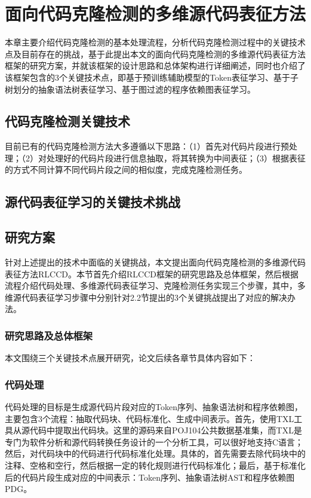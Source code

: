 \chapter{面向代码克隆检测的多维源代码表征方法}

本章主要介绍代码克隆检测的基本处理流程，分析代码克隆检测过程中的关键技术点及目前存在的挑战，基于此提出本文的面向代码克隆检测的多维源代码表征方法框架的研究方案，并就该框架的设计思路和总体架构进行详细阐述，同时也介绍了该框架包含的3个关键技术点，即基于预训练辅助模型的Token表征学习、基于子树划分的抽象语法树表征学习、基于图过滤的程序依赖图表征学习。

\section{代码克隆检测关键技术}

目前已有的代码克隆检测方法大多遵循以下思路：（1）首先对代码片段进行预处理；（2）对处理好的代码片段进行信息抽取，将其转换为中间表征；（3）根据表征的方式不同计算不同代码片段之间的相似度，完成克隆检测任务。



\section{源代码表征学习的关键技术挑战}



\section{研究方案}
针对上述提出的技术中面临的关键挑战，本文提出面向代码克隆检测的多维源代码表征方法RLCCD。本节首先介绍RLCCD框架的研究思路及总体框架，然后根据流程介绍代码处理、多维源代码表征学习、克隆检测任务实现三个步骤，其中，多维源代码表征学习步骤中分别针对2.2节提出的3个关键挑战提出了对应的解决办法。




\subsection{研究思路及总体框架}

本文围绕三个关键技术点展开研究，论文后续各章节具体内容如下：

\subsection{代码处理}
代码处理的目标是生成源代码片段对应的Token序列、抽象语法树和程序依赖图，主要包含3个流程：抽取代码块、代码标准化、生成中间表示。首先，使用TXL工具从源代码中提取出代码块。这里的源码来自POJ104公共数据基准集，而TXL是专门为软件分析和源代码转换任务设计的一个分析工具，可以很好地支持C语言；然后，对代码块中的代码进行代码标准化处理。具体的，首先需要去除代码块中的注释、空格和空行，然后根据一定的转化规则进行代码标准化；最后，基于标准化后的代码片段生成对应的中间表示：Token序列、抽象语法树AST和程序依赖图PDG。

